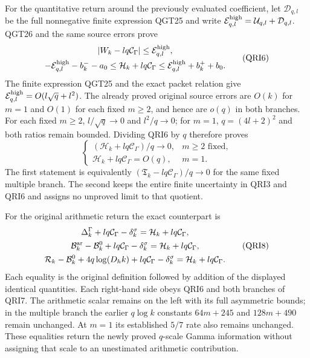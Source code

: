\documentclass[11pt,a4paper]{article}
\begin{document}
For the quantitative return around the previously evaluated coefficient,
let $\mathcal D_{q,l}$ be the full nonnegative finite expression QGT25
and write $\mathcal E_{q,l}^{\rm high}=\mathcal U_{q,l}+\mathcal D_{q,l}$.
QGT26 and the same source errors prove
\[
\begin{gathered}
 |W_k-lq\mathcal C_\Gamma|\le\mathcal E_{q,l}^{\rm high},\\
 -\mathcal E_{q,l}^{\rm high}-b_k^--a_0
 \le \mathcal H_k+lq\mathcal C_\Gamma
 \le \mathcal E_{q,l}^{\rm high}+b_k^++b_0.
\end{gathered}\tag{QRI6}
\]
The finite expression QGT25 and the exact packet relation give
$\mathcal E_{q,l}^{\rm high}=O(l\sqrt q+l^2)$.
The already proved original source errors are $O(k)$ for $m=1$
and $O(1)$ for each fixed $m\ge2$, and hence are $o(q)$ in both
branches. For each fixed $m\ge2$, $l/\sqrt q\to0$ and
$l^2/q\to0$; for $m=1$, $q=(4l+2)^2$ and both ratios remain
bounded. Dividing QRI6 by $q$ therefore proves
\[
 \begin{cases}
 (\mathcal H_k+lq\mathcal C_\Gamma)/q\longrightarrow0,
                   &m\ge2\text{ fixed},\\
 \mathcal H_k+lq\mathcal C_\Gamma=O(q),&m=1.
 \end{cases}
 \tag{QRI7}
\]
The first statement is equivalently
$(\mathfrak T_k-lq\mathcal C_\Gamma)/q\to0$ for the same fixed
multiple branch. The second keeps the entire finite uncertainty
in QRI3 and QRI6 and assigns no unproved limit to that quotient.

For the original arithmetic return the exact counterpart is
\[
\begin{gathered}
 \Delta_k^\Gamma+lq\mathcal C_\Gamma-\delta_k^\sigma
       =\mathcal H_k+lq\mathcal C_\Gamma,\\
 \mathcal B_k^{\rm ar}-\mathcal B_k^0+lq\mathcal C_\Gamma
       -\delta_k^\sigma=\mathcal H_k+lq\mathcal C_\Gamma,\\
 \mathcal R_k-\mathcal B_k^0+4q\log(D_hk)
       +lq\mathcal C_\Gamma-\delta_k^\sigma
       =\mathcal H_k+lq\mathcal C_\Gamma.
\end{gathered}\tag{QRI8}
\]
Each equality is the original definition followed by addition of
the displayed identical quantities. Each right-hand side obeys
QRI6 and both branches of QRI7. The arithmetic scalar remains
on the left with its full asymmetric bounds; in the multiple
branch the earlier $q\log k$ constants $64m+245$ and $128m+490$
remain unchanged. At $m=1$ its established $5/7$ rate also
remains unchanged. These equalities return the newly proved
$q$-scale Gamma information without assigning that scale to an
unestimated arithmetic contribution.
\end{document}

